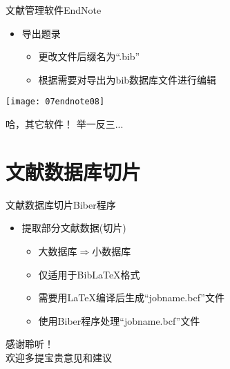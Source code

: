\documentclass[fontset = none, t]{ctexbeamer}
\begin{document}
\begin{frame}[fragile]{文献管理软件}{EndNote}
  \begin{spacing}{1.2}
    \begin{itemize}
    \item 导出题录
      \begin{itemize}
      \item 更改文件后缀名为\enquote{.bib}
      \item 根据需要对导出为bib数据库文件进行编辑
      \end{itemize}
    \end{itemize}    
    \begin{center}
      \texttt{[image: 07endnote08]}
    \end{center}
  \end{spacing}
\end{frame}

\begin{frame}
  哈，其它软件！
  举一反三...
\end{frame}
\section[文献数据库切片]{文献数据库切片}
\begin{frame}[fragile]{文献数据库切片}{Biber程序}
  \begin{spacing}{1.5}
    \begin{itemize}
    \item 提取部分文献数据(切片)
      \begin{itemize}
      \item 大数据库$\Rightarrow$小数据库
      \item 仅适用于Bib\LaTeX 格式
      \item 需要用\LaTeX 编译后生成\enquote{jobname.bcf}文件
      \item 使用Biber程序处理\enquote{jobname.bcf}文件
      \end{itemize}
    \end{itemize}    
    \begin{center}
      \begin{minipage}[h]{0.9\textwidth}
      \end{minipage}
    \end{center}
  \end{spacing}
\end{frame}

\begin{frame}
  \centering
  感谢聆听！\\
  欢迎多提宝贵意见和建议
\end{frame}
\end{document}
